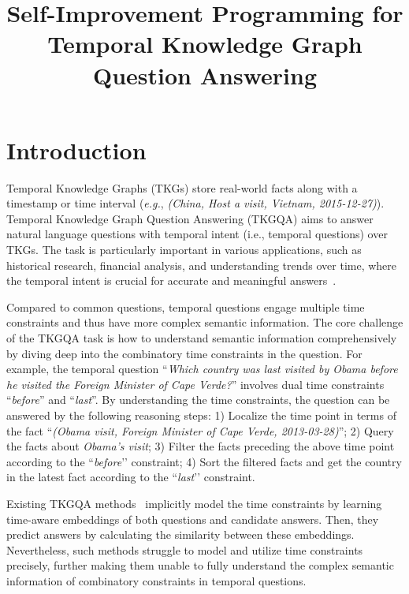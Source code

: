 \documentclass[10pt, a4paper]{article}
\title{Self-Improvement Programming for Temporal Knowledge Graph Question Answering}
\begin{document}
\maketitleabstract

\section{Introduction}\label{sec:intro}
Temporal Knowledge Graphs (TKGs) store real-world facts along with a timestamp or time interval   (\emph{e.g.}, \textit{(China, Host a visit, Vietnam, 2015-12-27)}). Temporal Knowledge Graph Question Answering (TKGQA) aims to answer natural language questions with temporal intent (i.e., temporal questions) over TKGs. The task is particularly important in various applications, such as historical research, financial analysis, and understanding trends over time, where the temporal intent is crucial for accurate and meaningful answers~\cite{ludemann2020knowledge, xu2023artificial}.

Compared to common questions, temporal questions engage multiple time constraints and thus have more complex semantic information. The core challenge of the TKGQA task is how to understand semantic information comprehensively by diving deep into the combinatory time constraints in the question. 
For example, the temporal question ``\textit{Which country was last visited by Obama before he visited the Foreign Minister of Cape Verde?}” involves dual time constraints ``\textit{before}'' and ``\textit{last}''. By understanding the time constraints, the question can be answered by the following reasoning steps: 1) Localize the time point in terms of the fact ``\textit{(Obama visit, Foreign Minister of Cape Verde, 2013-03-28)}''; 2) Query the facts about \textit{Obama's visit}; 3) Filter the facts preceding the above time point according to the ``\textit{before}’' constraint; 4) Sort the filtered facts and get the country in the latest fact according to the ``\textit{last}'’ constraint.

Existing TKGQA methods~\cite{saxena2021question,mavromatis2022tempoqr} implicitly model the time constraints by learning time-aware embeddings of both questions and candidate answers. Then, they predict answers by calculating the similarity between these embeddings. Nevertheless, such methods struggle to model and utilize time constraints precisely, further making them unable to fully understand the complex semantic information of combinatory constraints in temporal questions.
\end{document}
